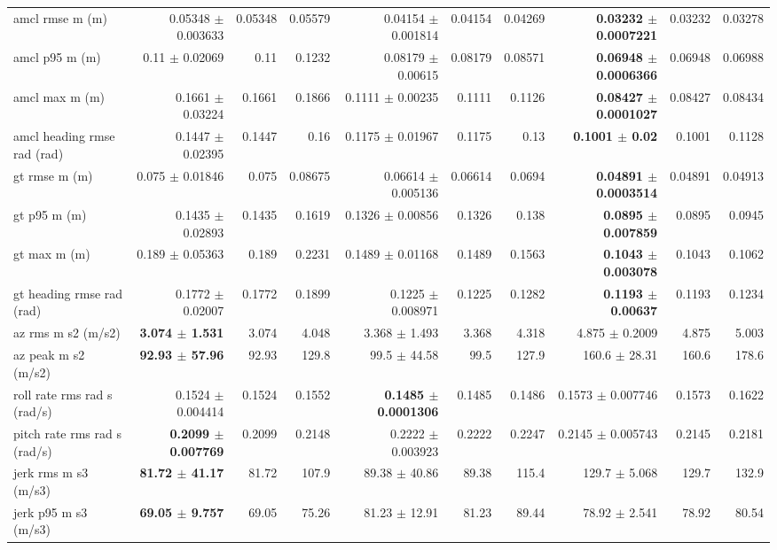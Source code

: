 \begin{table}[t]
\begin{tabular}{p{}*{9}{r}}
amcl rmse m (m) & 0.05348 $\pm$ 0.003633 & 0.05348 & 0.05579 & 0.04154 $\pm$ 0.001814 & 0.04154 & 0.04269 & \textbf{0.03232 $\pm$ 0.0007221} & 0.03232 & 0.03278 \\
amcl p95 m (m) & 0.11 $\pm$ 0.02069 & 0.11 & 0.1232 & 0.08179 $\pm$ 0.00615 & 0.08179 & 0.08571 & \textbf{0.06948 $\pm$ 0.0006366} & 0.06948 & 0.06988 \\
amcl max m (m) & 0.1661 $\pm$ 0.03224 & 0.1661 & 0.1866 & 0.1111 $\pm$ 0.00235 & 0.1111 & 0.1126 & \textbf{0.08427 $\pm$ 0.0001027} & 0.08427 & 0.08434 \\
amcl heading rmse rad (rad) & 0.1447 $\pm$ 0.02395 & 0.1447 & 0.16 & 0.1175 $\pm$ 0.01967 & 0.1175 & 0.13 & \textbf{0.1001 $\pm$ 0.02} & 0.1001 & 0.1128 \\
gt rmse m (m) & 0.075 $\pm$ 0.01846 & 0.075 & 0.08675 & 0.06614 $\pm$ 0.005136 & 0.06614 & 0.0694 & \textbf{0.04891 $\pm$ 0.0003514} & 0.04891 & 0.04913 \\
gt p95 m (m) & 0.1435 $\pm$ 0.02893 & 0.1435 & 0.1619 & 0.1326 $\pm$ 0.00856 & 0.1326 & 0.138 & \textbf{0.0895 $\pm$ 0.007859} & 0.0895 & 0.0945 \\
gt max m (m) & 0.189 $\pm$ 0.05363 & 0.189 & 0.2231 & 0.1489 $\pm$ 0.01168 & 0.1489 & 0.1563 & \textbf{0.1043 $\pm$ 0.003078} & 0.1043 & 0.1062 \\
gt heading rmse rad (rad) & 0.1772 $\pm$ 0.02007 & 0.1772 & 0.1899 & 0.1225 $\pm$ 0.008971 & 0.1225 & 0.1282 & \textbf{0.1193 $\pm$ 0.00637} & 0.1193 & 0.1234 \\
az rms m s2 (m/s2) & \textbf{3.074 $\pm$ 1.531} & 3.074 & 4.048 & 3.368 $\pm$ 1.493 & 3.368 & 4.318 & 4.875 $\pm$ 0.2009 & 4.875 & 5.003 \\
az peak m s2 (m/s2) & \textbf{92.93 $\pm$ 57.96} & 92.93 & 129.8 & 99.5 $\pm$ 44.58 & 99.5 & 127.9 & 160.6 $\pm$ 28.31 & 160.6 & 178.6 \\
roll rate rms rad s (rad/s) & 0.1524 $\pm$ 0.004414 & 0.1524 & 0.1552 & \textbf{0.1485 $\pm$ 0.0001306} & 0.1485 & 0.1486 & 0.1573 $\pm$ 0.007746 & 0.1573 & 0.1622 \\
pitch rate rms rad s (rad/s) & \textbf{0.2099 $\pm$ 0.007769} & 0.2099 & 0.2148 & 0.2222 $\pm$ 0.003923 & 0.2222 & 0.2247 & 0.2145 $\pm$ 0.005743 & 0.2145 & 0.2181 \\
jerk rms m s3 (m/s3) & \textbf{81.72 $\pm$ 41.17} & 81.72 & 107.9 & 89.38 $\pm$ 40.86 & 89.38 & 115.4 & 129.7 $\pm$ 5.068 & 129.7 & 132.9 \\
jerk p95 m s3 (m/s3) & \textbf{69.05 $\pm$ 9.757} & 69.05 & 75.26 & 81.23 $\pm$ 12.91 & 81.23 & 89.44 & 78.92 $\pm$ 2.541 & 78.92 & 80.54 \\

\end{tabular}
\end{table}
